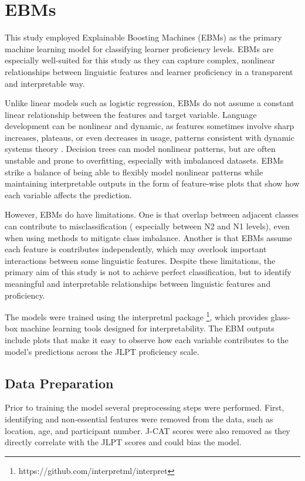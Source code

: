 \section{EBMs}
This study employed Explainable Boosting Machines (EBMs) \citep{nori2019} as the primary machine learning model for
classifying learner proficiency levels. EBMs are especially well-suited for this study as they can capture complex,
nonlinear relationships between linguistic features and learner proficiency in a transparent and interpretable way.

Unlike linear models such as logistic regression, EBMs do not assume a constant linear relationship
between the features and target variable. Language development can be nonlinear and dynamic, as features
sometimes involve sharp increases, plateaus, or even decreases in usage, patterns consistent with dynamic
systems
theory \citet{
Debot2007}. Decision trees can model nonlinear patterns, but are often unstable and
prone to
overfitting, especially with imbalanced
datasets. EBMs strike a balance of being able to flexibly model nonlinear patterns while maintaining interpretable
outputs in the form of feature-wise plots that show how each variable affects the prediction.

However, EBMs do have limitations. One is that overlap between adjacent classes can contribute to misclassification (
especially
between N2 and N1 levels), even when using methods to mitigate class imbalance. Another is that EBMs assume each
feature is contributes independently, which may overlook important interactions between some linguistic features.
Despite
these limitations, the primary aim of this study is not to achieve perfect
classification, but to identify meaningful and interpretable relationships between linguistic
features and
proficiency.

The models were trained using the interpretml package \footnote{https://github.com/interpretml/interpret}, which
provides glass-box machine learning tools designed for interpretability. The EBM outputs include plots that make it
easy to observe how each variable contributes to the model's predictions across the JLPT proficiency scale.


\subsection{Data Preparation}
Prior to training the model several preprocessing steps were performed. First, identifying and non-essential
features were removed from the data, such as location, age, and participant number. J-CAT scores were also removed as
they
directly correlate with the JLPT scores and could bias the model.

